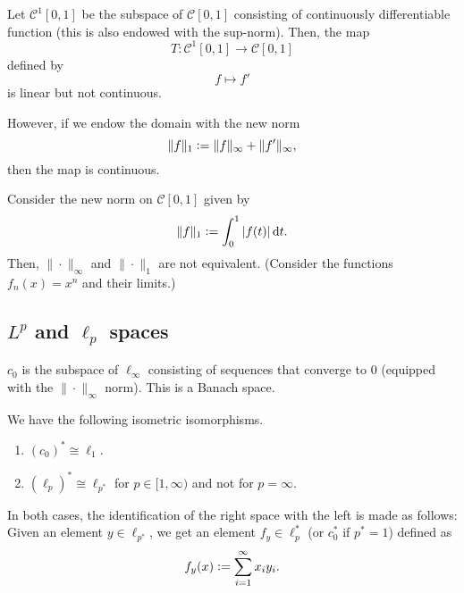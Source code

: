 \documentclass[12pt]{article}	%
\begin{document}
\begin{ex}
	Let $\mathcal{C}^{1}[0, 1]$ be the subspace of $\mathcal{C}[0, 1]$ consisting of continuously differentiable function (this is also endowed with the sup-norm). Then, the map
	\begin{equation*} 
		T : \mathcal{C}^{1}[0, 1] \to \mathcal{C}[0, 1]
	\end{equation*}
	defined by
	\begin{equation*} 
		f \mapsto f'
	\end{equation*}
	is linear but not continuous.

	However, if we endow the domain with the new norm
	\begin{equation*} 
		\|f\|_{1} \vcentcolon= \|f\|_{\infty} + \|f'\|_{\infty},
	\end{equation*}
	then the map is continuous.
\end{ex}

\begin{ex}
	Consider the new norm on $\mathcal{C}[0, 1]$ given by
	\begin{equation*} 
		\|f\|_{1} \vcentcolon= \int_{0}^{1} {\left\lvert f(t) \right\lvert} \,{\mathrm{d}}t.
	\end{equation*}
	Then, $\|\cdot\|_{\infty}$ and $\|\cdot\|_{1}$ are not equivalent. (Consider the functions $f_{n}(x) = x^{n}$ and their limits.)
\end{ex}

\subsection{\texorpdfstring{$L^{p}$}{Lp} and \texorpdfstring{$\ell_{p}$}{lp} spaces}

$c_{0}$ is the subspace of $\ell_{\infty}$ consisting of sequences that converge to $0$ (equipped with the $\|\cdot\|_{\infty}$ norm). This is a Banach space. \newline

\begin{thm} 
	We have the following isometric isomorphisms.
	\begin{enumerate}
		\item $(c_{0})^{\ast} \cong \ell_{1}$.
		\item $(\ell_{p})^{\ast} \cong \ell_{p^{\ast}}$ for $p \in [1, \infty)$ and not for $p = \infty$.
	\end{enumerate}

	In both cases, the identification of the right space with the left is made as follows: Given an element $y \in \ell_{p^{\ast}}$, we get an element $f_{y} \in \ell_{p}^{\ast}$ (or $c_{0}^{\ast}$ if $p^{\ast} = 1$) defined as
	\begin{equation*} 
		f_{y}(x) \vcentcolon= \sum_{i = 1}^{\infty} x_{i} y_{i}.
	\end{equation*}
\end{thm}
\end{document}
